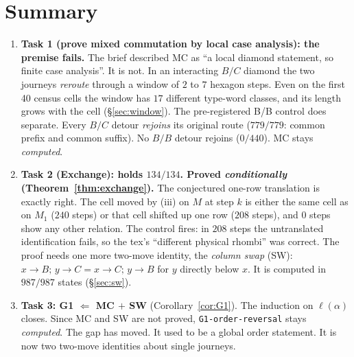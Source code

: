 \documentclass[11pt]{article}
\theoremstyle{definition}
\newcommand{\toB}{\!\to\! B}
\newcommand{\toC}{\!\to\! C}
\begin{document}
\section*{Summary}
\begin{enumerate}
\item \textbf{Task 1 (prove mixed commutation by local case analysis): the premise fails.} The brief described MC as ``a local
diamond statement, so finite case analysis''. It is not. In an interacting $B/C$ diamond the two journeys \emph{reroute} through a
window of $2$ to $7$ hexagon steps. Even on the first 40 census cells the window has $17$ different type-word classes, and its length grows with the cell
(\S\ref{sec:window}). The pre-registered B/B control does separate. Every $B/C$ detour \emph{rejoins} its original route
($779/779$: common prefix and common suffix). No $B/B$ detour rejoins ($0/440$). MC stays \emph{computed}.
\item \textbf{Task 2 (Exchange): holds $134/134$. Proved \emph{conditionally} (Theorem~\ref{thm:exchange}).} The conjectured
one-row translation is exactly right. The cell moved by (iii) on $M$ at step $k$ is either the same cell as on $M_1$ ($240$
steps) or that cell shifted up one row ($208$ steps), and $0$ steps show any other relation. The control fires: in $208$ steps the
untranslated identification fails, so the tex's ``different physical rhombi'' was correct. The proof needs one more two-move
identity, the \emph{column swap} (SW): $x\toB;\,y\toC = x\toC;\,y\toB$ for $y$ directly below $x$. It is computed in
$987/987$ states (\S\ref{sec:sw}).
\item \textbf{Task 3: G1 $\Leftarrow$ MC $+$ SW} (Corollary~\ref{cor:G1}). The induction on $\ell(\alpha)$ closes. Since MC and
SW are not proved, \texttt{G1-order-reversal} stays \emph{computed}. The gap has moved. It used to be a global order statement.
It is now two two-move identities about single journeys.
\end{enumerate}
\end{document}
